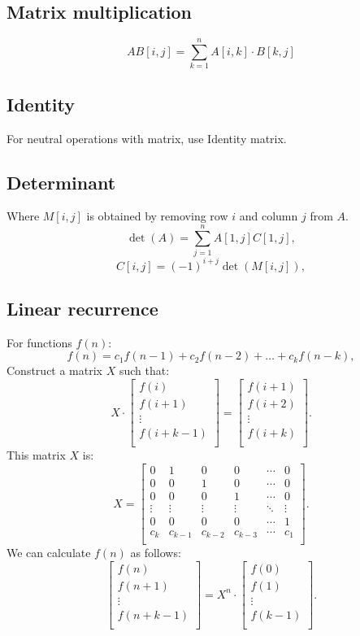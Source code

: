 \subsection{Matrix multiplication}
$$AB[i,j] = \sum_{k=1}^n A[i,k] \cdot B[k,j]$$
\subsection{Identity}
For neutral operations with matrix, use Identity matrix.
\subsection{Determinant} 
Where $M[i,j]$ is obtained by removing row $i$ and column $j$ from $A$.
\[\det(A)=\sum_{j=1}^n A[1,j] C[1,j],\]
\[C[i,j] = (-1)^{i+j} \det(M[i,j]),\]
\subsection{Linear recurrence}
For functions $f(n)$:
\[f(n) = c_1 f(n-1) + c_2 f(n-2) + \ldots + c_k f (n-k),\]
Construct a matrix $X$ such that:
\[ X \cdot
 \begin{bmatrix}
  f(i) \\
  f(i+1) \\
  \vdots \\
  f(i+k-1) \\
 \end{bmatrix}
=
 \begin{bmatrix}
  f(i+1) \\
  f(i+2) \\
  \vdots \\
  f(i+k) \\
 \end{bmatrix}.
\]
This matrix $X$ is:
\[
X =
 \begin{bmatrix}
  0 & 1 & 0 & 0 & \cdots & 0 \\
  0 & 0 & 1 & 0 & \cdots & 0 \\
  0 & 0 & 0 & 1 & \cdots & 0 \\
  \vdots & \vdots & \vdots & \vdots & \ddots & \vdots \\
  0 & 0 & 0 & 0 & \cdots & 1 \\
  c_k & c_{k-1} & c_{k-2} & c_{k-3} & \cdots & c_1 \\
 \end{bmatrix}.
\]
We can calculate $f(n)$ as follows:
\[
 \begin{bmatrix}
  f(n) \\
  f(n+1) \\
  \vdots \\
  f(n+k-1) \\
 \end{bmatrix}
=
X^n \cdot
 \begin{bmatrix}
  f(0) \\
  f(1) \\
  \vdots \\
  f(k-1) \\
 \end{bmatrix}.
\]

